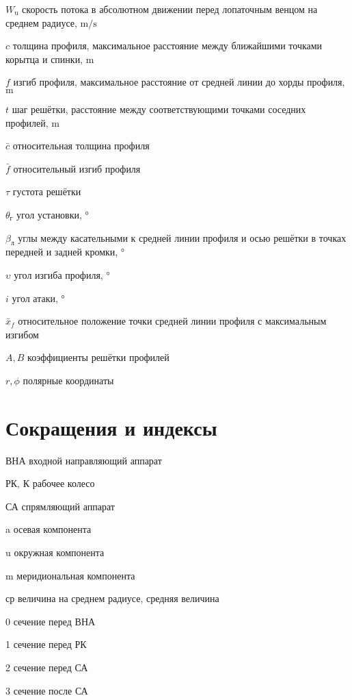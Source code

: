 \begin{eqexpl}
\item{\(W_{\text{u}}\)} скорость потока в абсолютном движении перед лопаточным венцом на среднем радиусе, $\si\meter/\si\second$
\item{\(c\)}  толщина профиля, максимальное расстояние между ближайшими точками корытца и спинки, \(\si\meter\) 
\item{\(f\)} изгиб профиля, максимальное расстояние от средней линии до хорды профиля, \(\si\meter\)
\item{\(t\)} шаг решётки, расстояние между соответствующими точками соседних профилей, \(\si\meter\)
\item{\(\bar{c}\)} относительная толщина профиля 
\item{\(\bar{f}\)} относительный изгиб профиля
\item{\(\tau\)} густота решётки
\item{\(\theta_{\text{г}}\)} угол установки, \(\si\degree\) 
\item{\(\beta_\text{л}\)} углы между касательными к средней линии профиля и осью решётки в точках передней и задней кромки, \(\si\degree\)
\item{\(\upsilon\)} угол изгиба профиля, \(\si\degree\)
\item{\(i\)} угол атаки, \(\si\degree\)
\item{\(\bar{x}_f\)} относительное положение точки средней линии профиля с максимальным изгибом
\item{\(A, B\)} коэффициенты решётки профилей
\item{\(r, \phi\)} полярные координаты

\end{eqexpl}

\section*{Сокращения и индексы}
\begin{eqexpl}

\item{ВНА} входной направляющий аппарат
\item{РК, К} рабочее колесо
\item{СА} спрямляющий аппарат
\item{a} осевая компонента
\item{u} окружная компонента
\item{m} меридиональная компонента
\item{ср} величина на среднем радиусе, средняя величина
\item{0} сечение перед ВНА
\item{1} сечение перед РК
\item{2} сечение перед СА
\item{3} сечение после СА

\end{eqexpl}

\FloatBarrier
